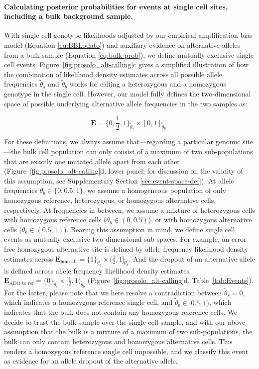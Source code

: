 \documentclass[12pt,inline]{wlscirep}
\begin{document}
\paragraph{Calculating posterior probabilities for events at single cell sites, including a bulk background sample.}
With single cell genotype likelihoods adjusted by our empirical amplification bias model (Equation \ref{eq:BBLodato}) and auxiliary evidence on alternative alleles from a bulk sample (Equation \ref{eq:bulk-prob}), we define mutually exclusive single cell events.
Figure~\ref{fig:prosolo_alt-calling}c gives a simplified illustration of how the combination of likelihood density estimates across all possible allele frequencies $\tilde{\theta}_s$ and $\tilde{\theta}_b$ works for calling a heterozygous and a homozygous genotype in the single cell.
However, our model fully defines the two-dimensional space of possible underlying alternative allele frequencies in the two samples as:

\begin{equation}
  \label{eq:event-space}
  \boldsymbol{E} =\{0, \frac{1}{2}, 1\}_{\tilde{\theta}_s} \times [0, 1]_{\tilde{\theta}_b}.
\end{equation}

For these definitions, we always assume that---regarding a particular genomic site---the bulk cell population can only consist of a maximum of two sub-populations that are exactly one mutated allele apart from each other (Figure~\ref{fig:prosolo_alt-calling}d, lower panel; for discussion on the validity of this assumption, see Supplementary Section \ref{sec:event-space-def}).
At allele frequencies $\theta_b \in \{0, 0.5, 1\}$, we assume a homogeneous population of only homozygous reference, heterozygous, or homozygous alternative cells, respectively.
At frequencies in between, we assume a mixture of heterozygous cells with homozygous reference cells ($\theta_b \in (0,0.5)$), or with homozygous alternative cells ($\theta_b \in (0.5,1)$).
Bearing this assumption in mind, we define single cell events as mutually exclusive two-dimensional sub-spaces.
For example, an error-free homozygous alternative site is defined by allele frequency likelihood density estimates across $\boldsymbol{E}_{\text{hom alt}} = \{ 1 \}_{\tilde{\theta}_s} \times (\frac{1}{2}, 1]_{\tilde{\theta}_b}$.
And the dropout of an alternative allele is defined across allele frequency likelihood density estimates $\boldsymbol{E}_{\text{ADO to ref}} = \{ 0 \}_{\tilde{\theta}_s} \times [\frac{1}{2}, 1)_{\tilde{\theta}_b}$ (Figure~\ref{fig:prosolo_alt-calling}d, Table~\ref{tab:Events}).
For the latter, please note that we here resolve a contradiction between $\tilde{\theta}_s = 0$, which indicates a homozygous reference single cell, and $\tilde{\theta}_b \in [0.5,1)$, which indicates that the bulk does not contain any homozygous reference cells.
We decide to trust the bulk sample over the single cell sample, and with our above assumption that the bulk is a mixture of a maximum of two sub-populations, the bulk can only contain heterozygous and homozygous alternative cells.
This renders a homozygous reference single cell impossible, and we classify this event as evidence for an allele dropout of the alternative allele.
\end{document}
